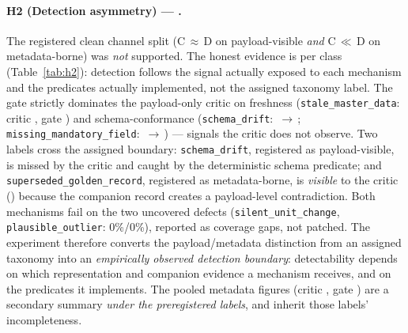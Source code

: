 \documentclass[11pt]{article}
\theoremstyle{plain}
\theoremstyle{definition}
\begin{document}
\paragraph{H2 (Detection asymmetry) --- \ResHtwo{}.}
The registered clean channel split (C\,$\approx$\,D on payload-visible \emph{and}
C\,$\ll$\,D on metadata-borne) was \emph{not} supported. The honest evidence is per class
(Table~\ref{tab:h2}): detection follows the signal actually exposed to each mechanism and
the predicates actually implemented, not the assigned taxonomy label. The gate strictly
dominates the payload-only critic on freshness (\texttt{stale\_master\_data}: critic
\HtwoDetStaleC{}, gate \HtwoDetStaleG{}) and schema-conformance (\texttt{schema\_drift}:
\HtwoDetSchemaC{}\,$\to$\,\HtwoDetSchemaG{}; \texttt{missing\_mandatory\_field}:
\HtwoDetMissingC{}\,$\to$\,\HtwoDetMissingG{}) --- signals the critic does not observe. Two
labels cross the assigned boundary: \texttt{schema\_drift}, registered as payload-visible,
is missed by the critic and caught by the deterministic schema predicate; and
\texttt{superseded\_golden\_record}, registered as metadata-borne, is \emph{visible} to the
critic (\HtwoDetSupersededC{}) because the companion record creates a payload-level
contradiction. Both mechanisms fail on the two uncovered defects
(\texttt{silent\_unit\_change}, \texttt{plausible\_outlier}: 0\%/0\%), reported as coverage
gaps, not patched. The experiment therefore converts the payload/metadata distinction from
an assigned taxonomy into an \emph{empirically observed detection boundary}: detectability
depends on which representation and companion evidence a mechanism receives, and on the
predicates it implements. The pooled metadata figures (critic \HtwoCriticMeta{}, gate
\HtwoGateMeta{}) are a secondary summary \emph{under the preregistered labels}, and inherit
those labels' incompleteness.
\end{document}
